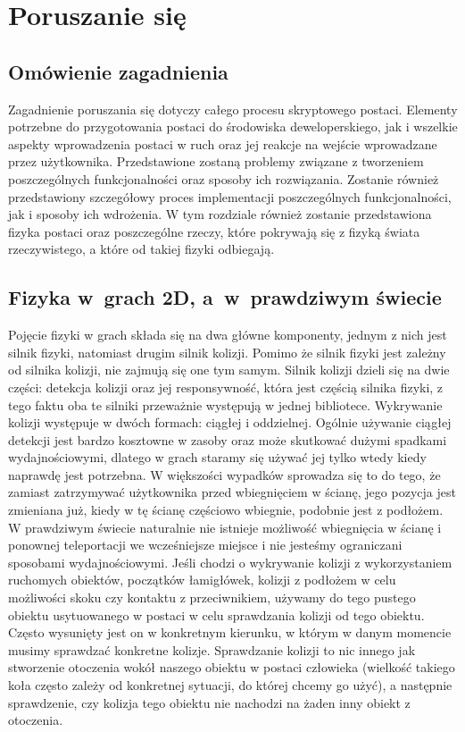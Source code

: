 \documentclass[oneside,polski,logo]{amuthesis}
\begin{document}
\section{Poruszanie się}
\subsection{Omówienie zagadnienia}
Zagadnienie poruszania się dotyczy całego procesu skryptowego postaci. Elementy potrzebne do przygotowania postaci do środowiska deweloperskiego, jak i wszelkie aspekty wprowadzenia postaci w ruch oraz jej reakcje na wejście wprowadzane przez użytkownika. Przedstawione zostaną problemy związane z tworzeniem poszczególnych funkcjonalności oraz sposoby ich rozwiązania. Zostanie również przedstawiony szczegółowy proces implementacji poszczególnych funkcjonalności, jak i sposoby ich wdrożenia. W tym rozdziale również zostanie przedstawiona fizyka postaci oraz poszczególne rzeczy, które pokrywają się z fizyką świata rzeczywistego, a które od takiej fizyki odbiegają.
\subsection{Fizyka w~grach 2D, a~w~prawdziwym świecie}
Pojęcie fizyki w grach składa się na dwa główne komponenty, jednym z nich jest silnik fizyki, natomiast drugim silnik kolizji. Pomimo że silnik fizyki jest zależny od silnika kolizji, nie zajmują się one tym samym.
Silnik kolizji dzieli się na dwie części: detekcja kolizji oraz jej responsywność, która jest częścią silnika fizyki, z tego faktu oba te silniki przeważnie występują w jednej bibliotece. Wykrywanie kolizji występuje w dwóch formach: ciągłej i oddzielnej. Ogólnie używanie ciągłej detekcji jest bardzo kosztowne w zasoby oraz może skutkować dużymi spadkami wydajnościowymi, dlatego w grach staramy się używać jej tylko wtedy kiedy naprawdę jest potrzebna. W większości wypadków sprowadza się to do tego, że zamiast zatrzymywać użytkownika przed wbiegnięciem w ścianę, jego pozycja jest zmieniana już, kiedy w tę ścianę częściowo wbiegnie, podobnie jest z podłożem. W prawdziwym świecie naturalnie nie istnieje możliwość wbiegnięcia w ścianę i ponownej teleportacji we wcześniejsze miejsce i nie jesteśmy ograniczani sposobami wydajnościowymi. Jeśli chodzi o wykrywanie kolizji z wykorzystaniem ruchomych obiektów, początków łamigłówek, kolizji z podłożem w celu możliwości skoku czy kontaktu z przeciwnikiem, używamy do tego pustego obiektu usytuowanego w postaci w celu sprawdzania kolizji od tego obiektu. Często wysunięty jest on w konkretnym kierunku, w którym w danym momencie musimy sprawdzać konkretne kolizje. Sprawdzanie kolizji to nic innego jak stworzenie otoczenia wokół naszego obiektu w postaci człowieka (wielkość takiego koła często zależy od konkretnej sytuacji, do której chcemy go użyć), a następnie sprawdzenie, czy kolizja tego obiektu nie nachodzi na żaden inny obiekt z otoczenia. \cite{physics1}
\end{document}
